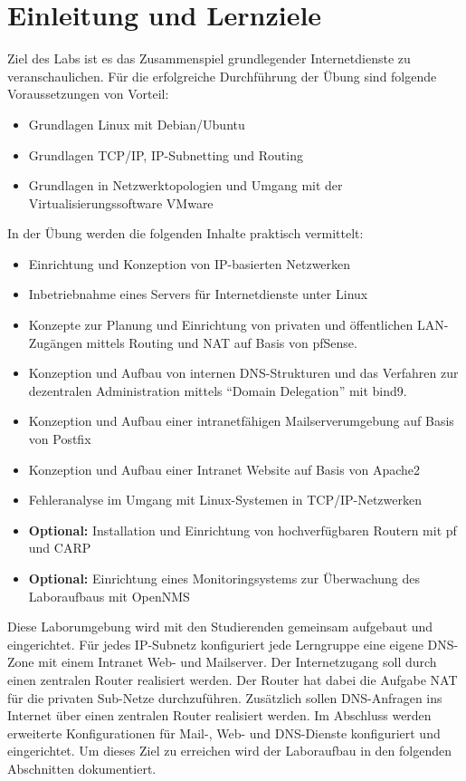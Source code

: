 \section{Einleitung und Lernziele}
Ziel des Labs ist es das Zusammenspiel grundlegender Internetdienste zu
veranschaulichen. Für die erfolgreiche Durchführung der Übung sind folgende
Voraussetzungen von Vorteil:
\begin{itemize}
  \item Grundlagen Linux mit Debian/Ubuntu
  \item Grundlagen TCP/IP, IP-Subnetting und Routing
  \item Grundlagen in Netzwerktopologien und Umgang mit der
  Virtualisierungssoftware VMware
\end{itemize}

In der Übung werden die folgenden Inhalte praktisch vermittelt:
\begin{itemize}
  \item Einrichtung und Konzeption von IP-basierten Netzwerken
  \item Inbetriebnahme eines Servers für Internetdienste unter Linux
  \item Konzepte zur Planung und Einrichtung von privaten und öffentlichen
  LAN-Zugängen mittels Routing und NAT auf Basis von pfSense.
  \item Konzeption und Aufbau von internen DNS-Strukturen und das Verfahren
  zur dezentralen Administration mittels "`Domain Delegation"' mit bind9.
  \item Konzeption und Aufbau einer intranetfähigen Mailserverumgebung auf Basis
  von Postfix
  \item Konzeption und Aufbau einer Intranet Website auf Basis von Apache2
  \item Fehleranalyse im Umgang mit Linux-Systemen in TCP/IP-Netzwerken
  \item {\bf Optional:} Installation und Einrichtung von hochverfügbaren Routern
  mit pf und CARP
  \item {\bf Optional:} Einrichtung eines Monitoringsystems zur Überwachung des
  Laboraufbaus mit OpenNMS
\end{itemize}

Diese Laborumgebung wird mit den Studierenden gemeinsam aufgebaut und
eingerichtet. Für jedes IP-Subnetz konfiguriert jede Lerngruppe eine eigene
DNS-Zone mit einem Intranet Web- und Mailserver. Der Internetzugang soll durch
einen zentralen Router realisiert werden. Der Router hat dabei die Aufgabe NAT
für die privaten Sub-Netze durchzuführen. Zusätzlich sollen DNS-Anfragen ins
Internet über einen zentralen Router realisiert werden. Im Abschluss werden
erweiterte Konfigurationen für Mail-, Web- und DNS-Dienste konfiguriert und
eingerichtet. Um dieses Ziel zu erreichen wird der Laboraufbau in den folgenden
Abschnitten dokumentiert.

